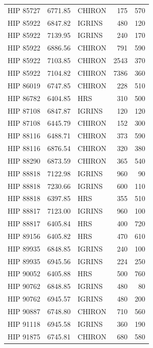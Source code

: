 \begin{scriptsize}
\begin{longtable}{|l|rlrr|}
   HIP 85727 &  6771.85 &     CHIRON &      175 &   570 \\
   HIP 85922 &  6847.82 &     IGRINS &      480 &   120 \\
   HIP 85922 &  7139.95 &     IGRINS &      240 &   170 \\
   HIP 85922 &  6886.56 &     CHIRON &      791 &   590 \\
   HIP 85922 &  7103.85 &     CHIRON &     2543 &   370 \\
   HIP 85922 &  7104.82 &     CHIRON &     7386 &   360 \\
   HIP 86019 &  6747.85 &     CHIRON &      228 &   510 \\
   HIP 86782 &  6404.85 &        HRS &      310 &   500 \\
   HIP 87108 &  6847.87 &     IGRINS &      120 &   120 \\
   HIP 87108 &  6445.79 &     CHIRON &      152 &   300 \\
   HIP 88116 &  6488.71 &     CHIRON &      373 &   590 \\
   HIP 88116 &  6876.54 &     CHIRON &      320 &   380 \\
   HIP 88290 &  6873.59 &     CHIRON &      365 &   540 \\
   HIP 88818 &  7122.98 &     IGRINS &      960 &    90 \\
   HIP 88818 &  7230.66 &     IGRINS &      600 &   110 \\
   HIP 88818 &  6397.85 &        HRS &      355 &   510 \\
   HIP 88817 &  7123.00 &     IGRINS &      960 &   100 \\
   HIP 88817 &  6405.84 &        HRS &      400 &   720 \\
   HIP 89156 &  6405.82 &        HRS &      470 &   610 \\
   HIP 89935 &  6848.85 &     IGRINS &      240 &   100 \\
   HIP 89935 &  6945.56 &     IGRINS &      224 &   250 \\
   HIP 90052 &  6405.88 &        HRS &      500 &   760 \\
   HIP 90762 &  6848.85 &     IGRINS &      480 &    80 \\
   HIP 90762 &  6945.57 &     IGRINS &      480 &   200 \\
   HIP 90887 &  6748.80 &     CHIRON &      710 &   560 \\
   HIP 91118 &  6945.58 &     IGRINS &      360 &   190 \\
   HIP 91875 &  6745.81 &     CHIRON &      680 &   580 \\

\end{longtable}
\end{scriptsize}
